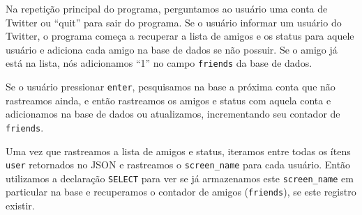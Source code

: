 
Na repetição principal do programa, perguntamos ao usuário uma conta de Twitter
ou ``quit'' para sair do programa. Se o usuário informar um usuário do Twitter,
o programa começa a recuperar a lista de amigos e os status para aquele
usuário e adiciona cada amigo na base de dados se não possuir. Se o amigo já
está na lista, nós adicionamos ``1'' no campo {\tt friends} da base de dados.



Se o usuário pressionar {\tt enter}, pesquisamos na base a próxima conta que
não rastreamos ainda, e então rastreamos os amigos e status com aquela conta
e adicionamos na base de dados ou atualizamos, incrementando seu contador de
{\tt friends}.


Uma vez que rastreamos a lista de amigos e status, iteramos entre todas os
ítens {\tt user} retornados no JSON e rastreamos o  \verb"screen_name" para
cada usuário. Então utilizamos a declaração {\tt SELECT} para ver se já
armazenamos este \verb"screen_name" em particular na base e recuperamos o
contador de amigos ({\tt friends}), se este registro existir.

